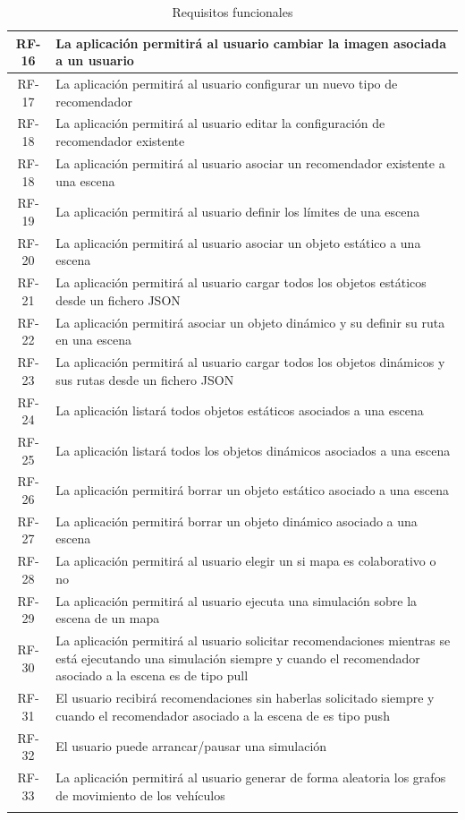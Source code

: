 \begin{longtable}[H]{|c|p{10cm}|}
	RF-16 & La aplicación permitirá al usuario cambiar la imagen asociada a un usuario\\ \hline
	RF-17 & La aplicación permitirá al usuario configurar un nuevo tipo de recomendador\\ \hline
	RF-18 & La aplicación permitirá al usuario editar la configuración de recomendador existente\\ \hline
	RF-18 & La aplicación permitirá al usuario asociar un recomendador existente a una escena\\ \hline
	RF-19 & La aplicación permitirá al usuario definir los límites de una escena\\ \hline
	RF-20 & La aplicación permitirá al usuario asociar un objeto estático a una escena\\ \hline
	RF-21 & La aplicación permitirá al usuario cargar todos los objetos estáticos desde un fichero JSON\\ \hline
	RF-22 & La aplicación permitirá asociar un objeto dinámico y su definir su ruta en una escena\\ \hline
	RF-23 & La aplicación permitirá al usuario cargar todos los objetos dinámicos y sus rutas desde un fichero JSON\\ \hline
	RF-24 & La aplicación listará todos objetos estáticos asociados a una escena \\ \hline
	RF-25 & La aplicación listará todos los objetos dinámicos asociados a una escena \\ \hline
	RF-26 & La aplicación permitirá borrar un objeto estático asociado a una escena\\ \hline
	RF-27 & La aplicación permitirá borrar un objeto dinámico asociado a una escena\\ \hline
	RF-28 & La aplicación permitirá al usuario elegir un si mapa es colaborativo o no\\ \hline
	RF-29 & La aplicación permitirá al usuario ejecuta una simulación sobre la escena de un mapa\\ \hline
	RF-30 & La aplicación permitirá al usuario solicitar recomendaciones mientras se está ejecutando una simulación siempre y cuando el recomendador asociado a la escena es de tipo pull\\ \hline
	RF-31 & El usuario recibirá recomendaciones sin haberlas solicitado siempre y cuando el recomendador asociado a la escena de es tipo push\\ \hline
	RF-32 & El usuario puede arrancar/pausar una simulación\\ \hline
	RF-33 & La aplicación permitirá al usuario generar de forma aleatoria los grafos de movimiento de los vehículos \\ \hline	
	\caption{Requisitos funcionales}
	\label{tabla:requisitosFuncionales}
\end{longtable}

